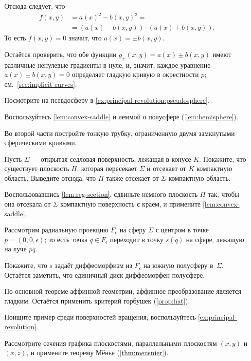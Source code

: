 Отсюда следует, что 
\begin{align*}
f(x,y)&=a(x)^2-b(x,y)^2=
\\
&=
(a(x)-b(x,y))\cdot (a(x)+b(x,y)).
\end{align*}
То есть $f(x,y)=0$ значит, что $a(x)=\pm b(x,y)$.

Остаётся проверить, что обе функции $g_\pm(x,y)=a(x)\pm b(x,y)$ имеют различные ненулевые градиенты в нуле, и, значит, каждое уравнение $a(x)\pm b(x,y) =0$ определяет гладкую кривую в окрестности $p$;
см.~\ref{sec:implicit-curves}.



Посмотрите на псевдосферу в \ref{ex:principal-revolution:pseudosphere}.

Воспользуйтесь \ref{lem:convex-saddle} и леммой о полусфере (\ref{lem:hemisphere}).

Во второй части постройте тонкую трубку, ограниченную двумя замкнутыми сферическими кривыми.

Пусть $\Sigma$ --- открытая седловая поверхность, лежащая в конусе $K$.
Покажите, что существует плоскость $\Pi$, которая пересекает $\Sigma$ и отсекает от $K$ компактную область.
Выведите отсюда, что $\Pi$ также отсекает от $\Sigma$ компактную область.

Воспользовавшись \ref{lem:reg-section}, сдвиньте немного плоскость $\Pi$ так, чтобы она отсекала от $\Sigma$ компактную поверхность с краем, и примените \ref{lem:convex-saddle}.

Рассмотрим радиальную проекцию $F_\epsilon$ на сферу $\Sigma$ с центром в точке $p=(0,0,\epsilon)$;
то есть точка $q\in F_\epsilon$ переходит в точку $s(q)$ на сфере, лежащую на луче $pq$.

Покажите, что $s$ задаёт диффеоморфизм из $F_\epsilon$ на южную полусферу в~$\Sigma$.
Остаётся заметить, что единичный диск диффеоморфен полусфере.

По основной теореме аффинной геометрии, аффинное преобразование является гладким.
Остаётся применить критерий горбушек (\ref{prop:hat}).

Поищите пример среди поверхностей вращения;
воспользуйтесь \ref{ex:principal-revolution}.

Рассмотрите сечения графика плоскостями, параллельными плоскостям $(x,y)$ и $(x,z)$, и примените теорему Мёнье (\ref{thm:meusnier}).

